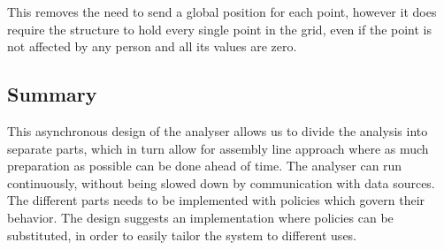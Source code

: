 This removes the need to send a global position for each point, however it does require the structure to hold every single point in the grid, even if the point is not affected by any person and all its values are zero.


\subsection{Summary}

This asynchronous design of the analyser allows us to divide the analysis into separate parts, which in turn allow for assembly line approach where as much preparation as possible can be done ahead of time. The analyser can run continuously, without being slowed down by communication with data sources. The different parts needs to be implemented with policies which govern their behavior. The design suggests an implementation where policies can be substituted, in order to easily tailor the system to different uses.